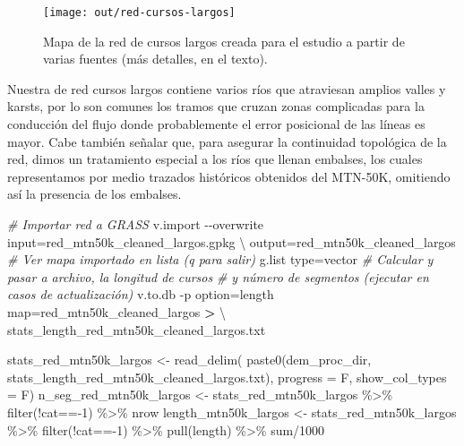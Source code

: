 \documentclass[spanish]{article}
\newenvironment{Shaded}{\begin{snugshade}}{\end{snugshade}}
\newcommand{\AttributeTok}[1]{\textcolor[rgb]{0.77,0.63,0.00}{#1}}
\newcommand{\CommentTok}[1]{\textcolor[rgb]{0.56,0.35,0.01}{\textit{#1}}}
\newcommand{\DataTypeTok}[1]{\textcolor[rgb]{0.13,0.29,0.53}{#1}}
\newcommand{\DecValTok}[1]{\textcolor[rgb]{0.00,0.00,0.81}{#1}}
\newcommand{\ExtensionTok}[1]{#1}
\newcommand{\FunctionTok}[1]{\textcolor[rgb]{0.00,0.00,0.00}{#1}}
\newcommand{\NormalTok}[1]{#1}
\newcommand{\OperatorTok}[1]{\textcolor[rgb]{0.81,0.36,0.00}{\textbf{#1}}}
\newcommand{\OtherTok}[1]{\textcolor[rgb]{0.56,0.35,0.01}{#1}}
\newcommand{\SpecialCharTok}[1]{\textcolor[rgb]{0.00,0.00,0.00}{#1}}
\newcommand{\StringTok}[1]{\textcolor[rgb]{0.31,0.60,0.02}{#1}}
\begin{document}
\begin{figure}

{\centering \texttt{[image: out/red-cursos-largos]} 

}

\caption{Mapa de la red de cursos largos creada para el estudio a partir de varias fuentes (más detalles, en el texto).}\label{fig:redcursoslargos}
\end{figure}

Nuestra de red cursos largos contiene varios ríos que atraviesan amplios
valles y karsts, por lo son comunes los tramos que cruzan zonas
complicadas para la conducción del flujo donde probablemente el error
posicional de las líneas es mayor. Cabe también señalar que, para
asegurar la continuidad topológica de la red, dimos un tratamiento
especial a los ríos que llenan embalses, los cuales representamos por
medio trazados históricos obtenidos del MTN-50K, omitiendo así la
presencia de los embalses.

\begin{Shaded}
\begin{Highlighting}[]
\CommentTok{\# Importar red a GRASS}
\ExtensionTok{v.import} \AttributeTok{{-}{-}overwrite}\NormalTok{ input=red\_mtn50k\_cleaned\_largos.gpkg }\DataTypeTok{\textbackslash{}}
\NormalTok{  output=red\_mtn50k\_cleaned\_largos}
\CommentTok{\# Ver mapa importado en lista (q para salir)}
\ExtensionTok{g.list}\NormalTok{ type=vector}
\CommentTok{\# Calcular y pasar a archivo, la longitud de cursos}
\CommentTok{\# y número de segmentos (ejecutar en casos de actualización)}
\ExtensionTok{v.to.db} \AttributeTok{{-}p}\NormalTok{ option=length map=red\_mtn50k\_cleaned\_largos }\OperatorTok{\textgreater{}} \DataTypeTok{\textbackslash{} }
  \ExtensionTok{stats\_length\_red\_mtn50k\_cleaned\_largos.txt}
\end{Highlighting}
\end{Shaded}

\begin{Shaded}
\begin{Highlighting}[]
\NormalTok{stats\_red\_mtn50k\_largos }\OtherTok{\textless{}{-}} \FunctionTok{read\_delim}\NormalTok{(}
  \FunctionTok{paste0}\NormalTok{(dem\_proc\_dir,}
         \StringTok{\textquotesingle{}stats\_length\_red\_mtn50k\_cleaned\_largos.txt\textquotesingle{}}\NormalTok{),}
  \AttributeTok{progress =}\NormalTok{ F, }\AttributeTok{show\_col\_types =}\NormalTok{ F)}
\NormalTok{n\_seg\_red\_mtn50k\_largos }\OtherTok{\textless{}{-}}\NormalTok{ stats\_red\_mtn50k\_largos }\SpecialCharTok{\%\textgreater{}\%}
  \FunctionTok{filter}\NormalTok{(}\SpecialCharTok{!}\NormalTok{cat}\SpecialCharTok{=={-}}\DecValTok{1}\NormalTok{) }\SpecialCharTok{\%\textgreater{}\%}\NormalTok{ nrow}
\NormalTok{length\_mtn50k\_largos }\OtherTok{\textless{}{-}}\NormalTok{ stats\_red\_mtn50k\_largos }\SpecialCharTok{\%\textgreater{}\%}
  \FunctionTok{filter}\NormalTok{(}\SpecialCharTok{!}\NormalTok{cat}\SpecialCharTok{=={-}}\DecValTok{1}\NormalTok{) }\SpecialCharTok{\%\textgreater{}\%} \FunctionTok{pull}\NormalTok{(length) }\SpecialCharTok{\%\textgreater{}\%}\NormalTok{ sum}\SpecialCharTok{/}\DecValTok{1000}
\end{Highlighting}
\end{Shaded}
\end{document}
